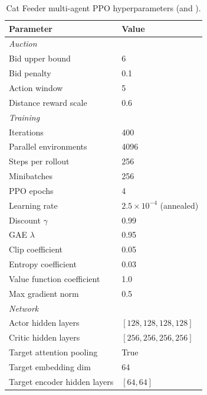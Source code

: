 \begin{table}[h]
\centering
\begin{tabular}{ll}
\toprule
Parameter & Value \\
\midrule
\multicolumn{2}{l}{\textit{Auction}} \\
Bid upper bound & 6 \\
Bid penalty & 0.1 \\
Action window & 5 \\
Distance reward scale & 0.6 \\
\midrule
\multicolumn{2}{l}{\textit{Training}} \\
Iterations & 400 \\
Parallel environments & 4096 \\
Steps per rollout & 256 \\
Minibatches & 256 \\
PPO epochs & 4 \\
Learning rate & $2.5 \times 10^{-4}$ (annealed) \\
Discount $\gamma$ & 0.99 \\
GAE $\lambda$ & 0.95 \\
Clip coefficient & 0.05 \\
Entropy coefficient & 0.03 \\
Value function coefficient & 1.0 \\
Max gradient norm & 0.5 \\
\midrule
\multicolumn{2}{l}{\textit{Network}} \\
Actor hidden layers & $[128, 128, 128, 128]$ \\
Critic hidden layers & $[256, 256, 256, 256]$ \\
Target attention pooling & True \\
Target embedding dim & 64 \\
Target encoder hidden layers & $[64, 64]$ \\
\bottomrule
\end{tabular}
\caption{Cat Feeder multi-agent PPO hyperparameters (\allpay and \poorman).}
\end{table}

